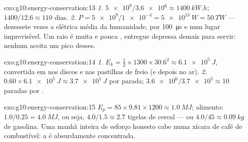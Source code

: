 \begin{solution}{exo:g10:energy-conservation:13}
\emph{1.} $\num{5e9}/\num{3.6e6} \approx \qty{1400}{kW.h}$;
$1400/12.6 \approx 110$ dias.
\emph{2.} $P = \num{5e9}/\num{1e-4} = \qty{5e13}{W} = \qty{50}{TW}$ ---
dezessete vezes a  elétrica média da humanidade, por
\qty{100}{\micro s} e num lugar imprevisível. Um raio é muita  e
pouca , entregue depressa demais para servir:  nenhum
aceita um pico desses.
\end{solution}

\begin{solution}{exo:g10:energy-conservation:14}
\emph{1.} $E_k = \tfrac12 \times 1300 \times 30.6^2 \approx
\qty{6.1e5}{J}$, convertida em  nos discos e nas pastilhas
de freio (e depois no ar).
\emph{2.} $0.60 \times \qty{6.1e5}{J} \approx \qty{3.7e5}{J}$ por parada;
$\num{3.6e6}/\num{3.7e5} \approx 10$ paradas por .
\end{solution}

\begin{solution}{exo:g10:energy-conservation:15}
$E_p = 85 \times 9.81 \times 1200 \approx \qty{1.0}{MJ}$; alimento:
$1.0/0.25 = \qty{4.0}{MJ}$, ou seja, $4.0/1.5 \approx 2.7$ tigelas de
cereal --- ou $4.0/45 \approx \qty{0.09}{kg}$ de gasolina. Uma manhã
inteira de esforço honesto cabe numa xícara de café de combustível: a
 é absurdamente concentrada.
\end{solution}

